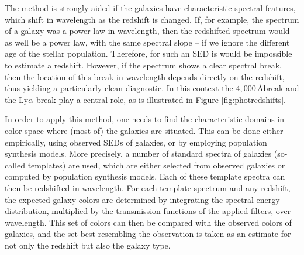 \documentclass[a4paper,11pt]{article}
\begin{document}
{\noindent}The method is strongly aided if the galaxies have characteristic spectral features, which shift in wavelength as the redshift is changed. If, for example, the spectrum of a galaxy was a power law in wavelength, then the redshifted spectrum would as well be a power law, with the same spectral slope -- if we ignore the different age of the stellar population. Therefore, for such an SED is would be impossible to estimate a redshift. However, if the spectrum shows a clear spectral break, then the location of this break in wavelength depends directly on the redshift, thus yielding a particularly clean diagnostic. In this context the $4,000\,$\AA break and the Ly$\alpha$-break play a central role, as is illustrated in Figure \ref{fig:photredshifts}.

{\noindent}In order to apply this method, one needs to find the characteristic domains in color space where (most of) the galaxies are situated. This can be done either empirically, using observed SEDs of galaxies, or by employing population synthesis models. More precisely, a number of standard spectra of galaxies (so-called templates) are used, which are either selected from observed galaxies or computed by population synthesis models. Each of these template spectra can then be redshifted in wavelength. For each template spectrum and any redshift, the expected galaxy colors are determined by integrating the spectral energy distribution, multiplied by the transmission functions of the applied filters, over wavelength. This set of colors can then be compared with the observed colors of galaxies, and the set best resembling the observation is taken as an estimate for not only the redshift but also the galaxy type.
\end{document}
